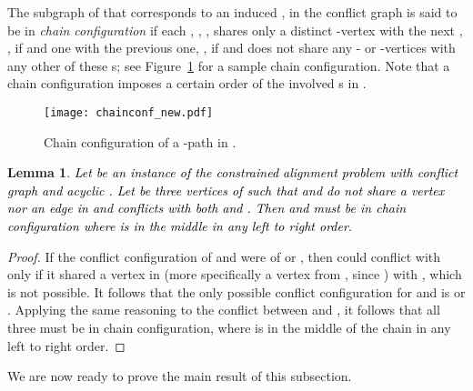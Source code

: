 \documentclass[final]{dmtcs-episciences}
\newtheorem{lemma}[theorem]{Lemma}
\newcommand\mar[1]{\textcolor{black}{#1}}
\begin{document}
The subgraph of  that corresponds to an induced , \mar{} in the conflict graph 
is said to be in  \emph{ chain configuration} if each , , , shares only a distinct -vertex with the next , , if  and one with the previous one, , if 
 and does not share any - or -vertices with any other of these s; see Figure~\ref{chain} for a sample chain configuration. 
Note that a chain configuration imposes a certain order of the involved s in . 

\begin{figure}[t]	   
\begin{center}	   
\texttt{[image: chainconf\_new.pdf]} 
\caption{\sf Chain configuration of a -path in . } 
\label{chain}	   
\end{center}	   
\end{figure}  


\begin{lemma}
\label{threeinchain}
\mar{Let  be an instance of the constrained alignment problem with conflict graph  and acyclic . Let  be three vertices of  such that  and  do not share a vertex nor an edge in  and  conflicts  with both  and . Then  and  must be in chain configuration where  is in the middle in any left to right order.}  
\end{lemma}
\begin{proof}
If 
the conflict configuration of  and  were of  or , then  could conflict with 
  only if it 
shared a vertex in  (more specifically a vertex from , since ) with , which is not possible. 
It follows that the only possible conflict configuration for 
  and  
is  or . Applying the same reasoning to the conflict between  and , it follows that 
all three must be in chain configuration, where  is in the middle of the chain in any left to right order. 
\end{proof}


We are now ready to prove the main result of this subsection.
\end{document}
